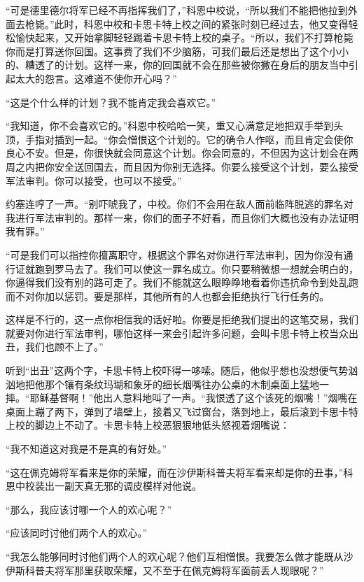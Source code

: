     “可是德里德尔将军已经不再指挥我们了，”科恩中校说，“所以我们不能把他拉到外面去枪毙。”此时，科恩中校和卡思卡特上校之间的紧张时刻已经过去，他又变得轻松愉快起来，又开始拿脚轻轻踢着卡思卡特上校的桌子。“所以，我们不打算枪毙你而是打算送你回国。这事费了我们不少脑筋，可我们最后还是想出了这个小小的、糟透了的计划。这样一来，你的回国就不会在那些被你撇在身后的朋友当中引起太大的怨言。这难道不使你开心吗？”

    “这是个什么样的计划？我不能肯定我会喜欢它。”

    “我知道，你不会喜欢它的。”科恩中校哈哈一笑，重又心满意足地把双手举到头顶，手指对插到一起。“你会憎恨这个计划的。它的确令人作呕，而且肯定会使你良心不安。但是，你很快就会同意这个计划。你会同意的，不但因为这计划会在两周之内把你安全送回国去，而且因为你别无选择。你要么接受这个计划，要么接受军法审判。你可以接受，也可以不接受。”

    约塞连哼了一声。“别吓唬我了，中校。你们不会用在敌人面前临阵脱逃的罪名对我进行军法审判的。那样一来，你们的面子不好看，而且你们大概也没有办法证明我有罪。”
 


    “可是我们可以指控你擅离职守，根据这个罪名对你进行军法审判，因为你没有通行证就跑到罗马去了。我们可以使这一罪名成立。你只要稍微想一想就会明白的，你逼得我们没有别的路可走了。我们不能就这么眼睁睁地看着你违抗命令到处乱跑而不对你加以惩罚。要是那样，其他所有的人也都会拒绝执行飞行任务的。

    这样是不行的，这一点你相信我的话好啦。你要是拒绝我们提出的这笔交易，我们就要对你进行军法审判，哪怕这样一来会引起许多问题，会叫卡思卡特上校当众出丑，我们也顾不上了。”

    听到“出丑”这两个字，卡思卡特上校吓得一哆嗦。随后，他似乎想也没想便气势汹汹地把他那个镶有条纹玛瑚和象牙的细长烟嘴往办公桌的木制桌面上猛地一摔。“耶稣基督啊！”他出人意料地叫了一声。“我恨透了这个该死的烟嘴！”烟嘴在桌面上蹦了两下，弹到了墙壁上，接着又飞过窗台，落到地上，最后滚到卡思卡特上校的脚边上不动了。卡思卡特上校恶狠狠地低头怒视着烟嘴说：

    “我不知道这对我是不是真的有好处。”

    “这在佩克姆将军看来是你的荣耀，而在沙伊斯科普夫将军看来却是你的丑事，”科恩中校装出一副天真无邪的调皮模样对他说。

    “那么，我应该讨哪一个人的欢心呢？”

    “应该同时讨他们两个人的欢心。”

    “我怎么能够同时讨他们两个人的欢心呢？他们互相憎恨。我要怎么做才能既从沙伊斯科普夫将军那里获取荣耀，又不至于在佩克姆将军面前丢人现眼呢？”

